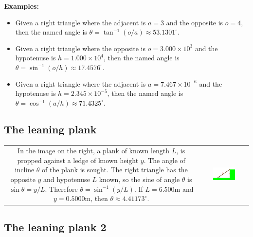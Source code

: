 \documentclass{article}
\begin{document}
\textbf{Examples:}
\begin{itemize}
\item Given a right triangle where the adjacent is \(a = 3\) and the opposite is \(o = 4\), then the named angle is \(\theta = \tan^{-1}(o/a) \approx 53.1301^\circ\).
\item Given a right triangle where the opposite is \(o = 3.000 \times 10^3\) and the hypotenuse is \(h = 1.000 \times 10^4\), then the named angle is \(\theta = \sin^{-1}(o/h) \approx 17.4576^\circ\). 
\item Given a right triangle where the adjacent is \(a = 7.467 \times 10^{-6}\) and the hypotenuse is \(h = 2.345 \times 10^{-5}\), then the named angle is \(\theta = \cos^{-1}(a/h) \approx 71.4325^\circ\).
\end{itemize}



\subsection{The leaning plank}

\begin{tabular}{cc}
\parbox{0.5\textwidth}{
In the image on the right, a plank of known length \(L\), is propped against a ledge of known height \(y\). The angle of incline \(\theta\) of the plank is sought. The right triangle has the opposite \(y\) and hypotenuse \(L\) known, so the sine of angle \(\theta\) is \(\sin\theta = y/L\). Therefore \(\theta = \sin^{-1}(y/L)\). If \(L = 6.500\text{m}\) and \(y = 0.5000\text{m}\), then \(\theta \approx 4.41173^\circ\). 
} & \parbox{0.5\textwidth}{
\includegraphics[width = 0.5\textwidth]{leaning_plank}
}
\end{tabular}



\subsection{The leaning plank 2}
\end{document}
